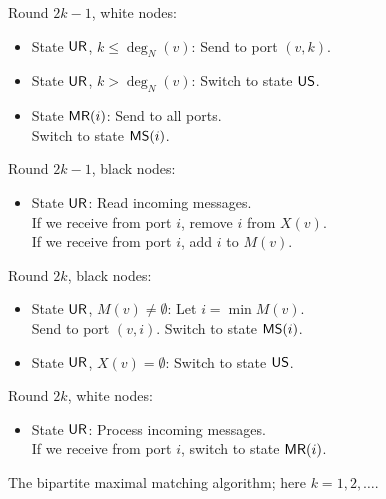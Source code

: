 \begin{table}
    \raggedright
    \algtoprule
    \begin{descriptionb}
        \item[Round $2k-1$, white nodes:] \mbox{}
        \begin{itemize}
            \item State $\textup{\sffamily UR}$, $k \le \deg_N(v)$: Send  to port $(v,k)$.
            \item State $\textup{\sffamily UR}$, $k > \deg_N(v)$: Switch to state $\textup{\sffamily US}$.
            \item State $\textup{\sffamily MR}(i)$: Send  to all ports. \\
                Switch to state $\textup{\sffamily MS}(i)$.
        \end{itemize}
        \item[Round $2k-1$, black nodes:] \mbox{}
        \begin{itemize}
            \item State $\textup{\sffamily UR}$: Read incoming messages. \\
                If we receive  from port $i$, remove $i$ from $X(v)$. \\
                If we receive  from port $i$, add $i$ to $M(v)$.
        \end{itemize}
        \item[Round $2k$, black nodes:] \mbox{}
        \begin{itemize}
            \item State $\textup{\sffamily UR}$, $M(v) \ne \emptyset$: Let $i = \min M(v)$. \\
                Send  to port $(v,i)$. Switch to state $\textup{\sffamily MS}(i)$.
            \item State $\textup{\sffamily UR}$, $X(v) = \emptyset$: Switch to state $\textup{\sffamily US}$.
        \end{itemize}
        \item[Round $2k$, white nodes:] \mbox{}
        \begin{itemize}
            \item State $\textup{\sffamily UR}$: Process incoming messages. \\
                If we receive  from port $i$, switch to state $\textup{\sffamily MR}(i)$.
        \end{itemize}
    \end{descriptionb}
    \algbottomrule
    \caption{The bipartite maximal matching algorithm; here $k = 1, 2, \dotsc$.}\label{tab:bmm}
\end{table}


